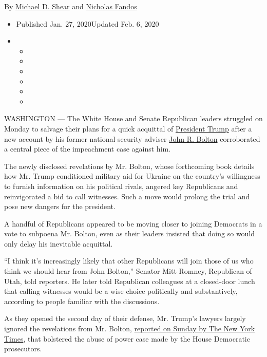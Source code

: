 By \href{https://www.nytimes3xbfgragh.onion/by/michael-d-shear}{Michael
D. Shear} and
\href{https://www.nytimes3xbfgragh.onion/by/nicholas-fandos}{Nicholas
Fandos}

\begin{itemize}
\item
  Published Jan. 27, 2020Updated Feb. 6, 2020
\item
  \begin{itemize}
  \item
  \item
  \item
  \item
  \item
  \item
  \end{itemize}
\end{itemize}

WASHINGTON --- The White House and Senate Republican leaders struggled
on Monday to salvage their plans for a quick acquittal of
\href{https://www.nytimes3xbfgragh.onion/2020/02/04/us/politics/state-of-the-union-address.html}{President
Trump} after a new account by his former national security adviser
\href{https://www.nytimes3xbfgragh.onion/2020/01/28/podcasts/the-daily/bolton-impeachment.html}{John
R. Bolton} corroborated a central piece of the impeachment case against
him.

The newly disclosed revelations by Mr. Bolton, whose forthcoming book
details how Mr. Trump conditioned military aid for Ukraine on the
country's willingness to furnish information on his political rivals,
angered key Republicans and reinvigorated a bid to call witnesses. Such
a move would prolong the trial and pose new dangers for the president.

A handful of Republicans appeared to be moving closer to joining
Democrats in a vote to subpoena Mr. Bolton, even as their leaders
insisted that doing so would only delay his inevitable acquittal.

``I think it's increasingly likely that other Republicans will join
those of us who think we should hear from John Bolton,'' Senator Mitt
Romney, Republican of Utah, told reporters. He later told Republican
colleagues at a closed-door lunch that calling witnesses would be a wise
choice politically and substantively, according to people familiar with
the discussions.

As they opened the second day of their defense, Mr. Trump's lawyers
largely ignored the revelations from Mr. Bolton,
\href{https://www.nytimes3xbfgragh.onion/2020/01/26/us/politics/trump-bolton-book-ukraine.html}{reported
on Sunday by The New York Times}, that bolstered the abuse of power case
made by the House Democratic prosecutors.

